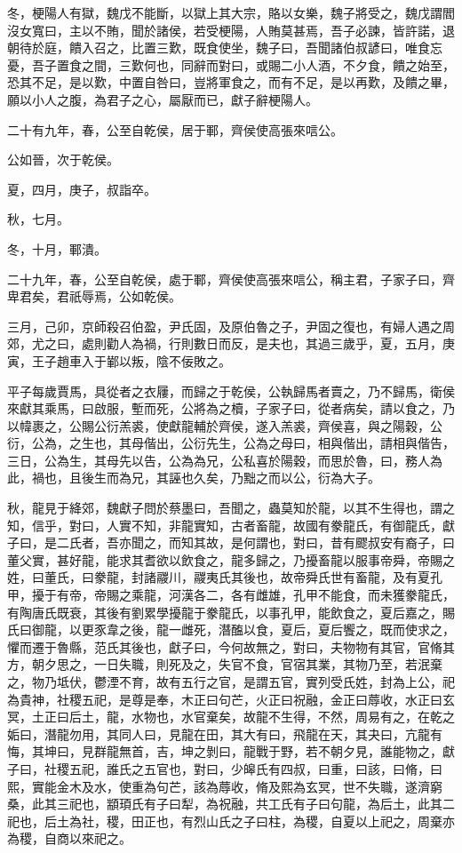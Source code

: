 \begin{pinyinscope}
冬，梗陽人有獄，魏戊不能斷，以獄上其大宗，賂以女樂，魏子將受之，魏戊謂閻沒女寬曰，主以不賄，聞於諸侯，若受梗陽，人賄莫甚焉，吾子必諫，皆許諾，退朝待於庭，饋入召之，比置三歎，既食使坐，魏子曰，吾聞諸伯叔諺曰，唯食忘憂，吾子置食之間，三歎何也，同辭而對曰，或賜二小人酒，不夕食，饋之始至，恐其不足，是以歎，中置自咎曰，豈將軍食之，而有不足，是以再歎，及饋之畢，願以小人之腹，為君子之心，屬厭而已，獻子辭梗陽人。

二十有九年，春，公至自乾侯，居于鄆，齊侯使高張來唁公。

公如晉，次于乾侯。

夏，四月，庚子，叔詣卒。

秋，七月。

冬，十月，鄆潰。

二十九年，春，公至自乾侯，處于鄆，齊侯使高張來唁公，稱主君，子家子曰，齊卑君矣，君祇辱焉，公如乾侯。

三月，己卯，京師殺召伯盈，尹氏固，及原伯魯之子，尹固之復也，有婦人遇之周郊，尤之曰，處則勸人為禍，行則數日而反，是夫也，其過三歲乎，夏，五月，庚寅，王子趙車入于鄻以叛，陰不佞敗之。

平子每歲賈馬，具從者之衣屨，而歸之于乾侯，公執歸馬者賣之，乃不歸馬，衛侯來獻其乘馬，曰啟服，塹而死，公將為之櫝，子家子曰，從者病矣，請以食之，乃以幃裹之，公賜公衍羔裘，使獻龍輔於齊侯，遂入羔裘，齊侯喜，與之陽穀，公衍，公為，之生也，其母偕出，公衍先生，公為之母曰，相與偕出，請相與偕告，三日，公為生，其母先以告，公為為兄，公私喜於陽穀，而思於魯，曰，務人為此，禍也，且後生而為兄，其誣也久矣，乃黜之而以公，衍為大子。

秋，龍見于絳郊，魏獻子問於蔡墨曰，吾聞之，蟲莫知於龍，以其不生得也，謂之知，信乎，對曰，人實不知，非龍實知，古者畜龍，故國有豢龍氏，有御龍氏，獻子曰，是二氏者，吾亦聞之，而知其故，是何謂也，對曰，昔有飂叔安有裔子，曰董父實，甚好龍，能求其耆欲以飲食之，龍多歸之，乃擾畜龍以服事帝舜，帝賜之姓，曰董氏，曰豢龍，封諸鬷川，鬷夷氏其後也，故帝舜氏世有畜龍，及有夏孔甲，擾于有帝，帝賜之乘龍，河漢各二，各有雌雄，孔甲不能食，而未獲豢龍氏，有陶唐氏既衰，其後有劉累學擾龍于豢龍氏，以事孔甲，能飲食之，夏后嘉之，賜氏曰御龍，以更豕韋之後，龍一雌死，潛醢以食，夏后，夏后饗之，既而使求之，懼而遷于魯縣，范氏其後也，獻子曰，今何故無之，對曰，夫物物有其官，官脩其方，朝夕思之，一日失職，則死及之，失官不食，官宿其業，其物乃至，若泯棄之，物乃坻伏，鬱湮不育，故有五行之官，是謂五官，實列受氏姓，封為上公，祀為貴神，社稷五祀，是尊是奉，木正曰句芒，火正曰祝融，金正曰蓐收，水正曰玄冥，土正曰后土，龍，水物也，水官棄矣，故龍不生得，不然，周易有之，在乾之姤曰，潛龍勿用，其同人曰，見龍在田，其大有曰，飛龍在天，其夬曰，亢龍有悔，其坤曰，見群龍無首，吉，坤之剝曰，龍戰于野，若不朝夕見，誰能物之，獻子曰，社稷五祀，誰氏之五官也，對曰，少皞氏有四叔，曰重，曰該，曰脩，曰熙，實能金木及水，使重為句芒，該為蓐收，脩及熙為玄冥，世不失職，遂濟窮桑，此其三祀也，顓頊氏有子曰犁，為祝融，共工氏有子曰句龍，為后土，此其二祀也，后土為社，稷，田正也，有烈山氏之子曰柱，為稷，自夏以上祀之，周棄亦為稷，自商以來祀之。


\end{pinyinscope}

